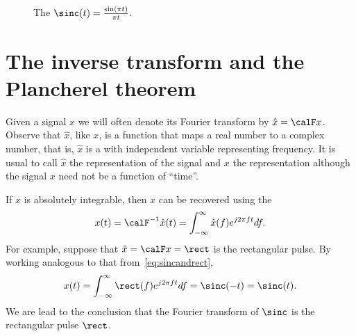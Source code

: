 
\begin{figure}
\centering
{}
\caption{The  $\sinc(t) = \frac{\sin(\pi t)}{\pi t}$.} \label{fig:sincfunction1}
\end{figure}


\section{The inverse transform and the Plancherel theorem}\label{sec:square-integr-sign}

Given a signal $x$ we will often denote its Fourier transform by $\hat{x} = \calF x$.  Observe that $\hat{x}$, like $x$, is a function that maps a real number to a complex number, that is, $\hat{x}$ is a  with independent variable representing frequency.  It is usual to call $\hat{x}$ the  representation of the signal and $x$ the  representation although the signal $x$ need not be a function of ``time''.  

If $\hat{x}$ is absolutely integrable, then $x$ can be recovered using the 
\begin{equation}\label{eq:inversefouriertransform}
x(t) = \calF^{-1}\hat{x}(t) =  \int_{-\infty}^\infty \hat{x}(f) e^{j2\pi ft} df.
\end{equation}
For example, suppose that $\hat{x} = \calF x = \rect$ is the rectangular pulse.  By working analogous to that from~\eqref{eq:sincandrect},
\[
x(t) = \int_{-\infty}^\infty \rect(f) e^{j2\pi ft} df = \sinc(-t) = \sinc(t).
\]
We are lead to the conclusion that the Fourier transform of $\sinc$ is the rectangular pulse $\rect$.

